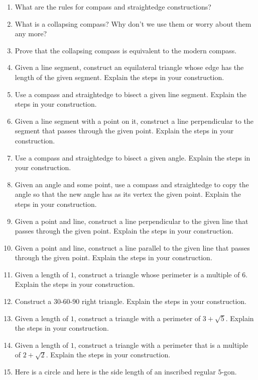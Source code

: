 \begin{problems}
\begin{enumerate}
\item What are the rules for compass and straightedge constructions?
\item What is a collapsing compass? Why don't we use them or worry about them any more?
\item Prove that the collapsing compass is equivalent to the modern compass.
\item Given a line segment, construct an equilateral triangle whose edge has the length of the given segment. Explain the steps in your construction.
\item Use a compass and straightedge to bisect a given line segment. Explain the steps in your construction.
\item Given a line segment with a point on it, construct a line perpendicular to the segment that passes through the given point. Explain the steps in your construction.
\item Use a compass and straightedge to bisect a given angle. Explain the steps in your construction.
\item Given an angle and some point, use a compass and straightedge to copy the angle so that the new angle has as its vertex the given point. Explain the steps in your construction.
\item Given a point and line, construct a line perpendicular to the given line that passes through the given point. Explain the steps in your construction.
\item Given a point and line, construct a line parallel to the given line that passes through the given point. Explain the steps in your construction.
\item Given a length of $1$, construct a triangle whose perimeter is a
  multiple of $6$. Explain the steps in your construction.
\item Construct a $30$-$60$-$90$ right triangle. Explain the steps in your
  construction.
\item Given a length of $1$, construct a triangle with a perimeter of
  $3 + \sqrt{5}$. Explain the steps in your construction.
\item Given a length of $1$, construct a triangle with a perimeter that is a multiple of
  $2 + \sqrt{2}$. Explain the steps in your construction.
\item Here is a circle and here is the side length of an inscribed
  regular $5$-gon.
\[
\]
\end{enumerate}
\end{problems}
